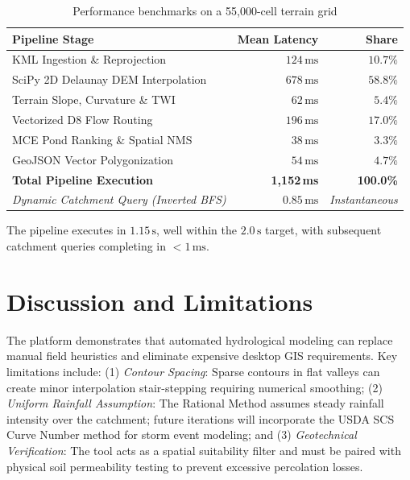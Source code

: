 \documentclass[manuscript,screen,review]{acmart}
\begin{document}
\begin{table}[h]
  \small
  \caption{Performance benchmarks on a 55,000-cell terrain grid}
  \label{tab:benchmarks}
  \begin{tabular}{lrr}
    \toprule
    Pipeline Stage & Mean Latency & Share \\
    \midrule
    KML Ingestion \& Reprojection & $124\,\text{ms}$ & $10.7\%$ \\
    SciPy 2D Delaunay DEM Interpolation & $678\,\text{ms}$ & $58.8\%$ \\
    Terrain Slope, Curvature \& TWI & $62\,\text{ms}$ & $5.4\%$ \\
    Vectorized D8 Flow Routing & $196\,\text{ms}$ & $17.0\%$ \\
    MCE Pond Ranking \& Spatial NMS & $38\,\text{ms}$ & $3.3\%$ \\
    GeoJSON Vector Polygonization & $54\,\text{ms}$ & $4.7\%$ \\
    \midrule
    \textbf{Total Pipeline Execution} & \textbf{1,152\,ms} & \textbf{100.0\%} \\
    \bottomrule
    \emph{Dynamic Catchment Query (Inverted BFS)} & \emph{$0.85\,\text{ms}$} & \emph{Instantaneous} \\
    \bottomrule
  \end{tabular}
\end{table}

The pipeline executes in $1.15\,\text{s}$, well within the $2.0\,\text{s}$ target, with subsequent catchment queries completing in $<1\,\text{ms}$.

\section{Discussion and Limitations}
\label{sec:discussion}
The platform demonstrates that automated hydrological modeling can replace manual field heuristics and eliminate expensive desktop GIS requirements. Key limitations include: (1) \emph{Contour Spacing}: Sparse contours in flat valleys can create minor interpolation stair-stepping requiring numerical smoothing; (2) \emph{Uniform Rainfall Assumption}: The Rational Method assumes steady rainfall intensity over the catchment; future iterations will incorporate the USDA SCS Curve Number method for storm event modeling; and (3) \emph{Geotechnical Verification}: The tool acts as a spatial suitability filter and must be paired with physical soil permeability testing to prevent excessive percolation losses.
\end{document}

